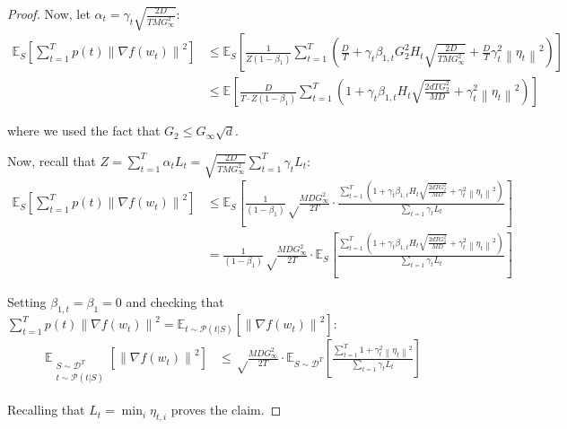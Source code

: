 \documentclass{article}
\newcommand{\norm}[1]{\left\lVert{#1}\right\rVert}
\newcommand{\currw}{w_t}
\newcommand{\curre}{\eta_t}
\newcommand{\currei}{\eta_{t,i}}
\newcommand{\curra}{\alpha_t}
\newcommand{\normed}[1]{\left\lVert {#1} \right\rVert}
\newcommand{\bone}{\beta_1}
\newcommand{\bonet}{\beta_{1,t}}
\newcommand{\fdist}{D}
\newcommand{\smooth}{M}
\newcommand{\lowinft}{L_{t}}
\newcommand{\highinft}{H_{t}}
\newcommand{\gradb}{G_\infty}
\newcommand{\gradbtwo}{G_2}
\newcommand{\expec}[2]{\mathbb E_{#1} \left[ {#2} \right]}
\newcommand{\algrand}{\substack{S \sim \dist^T \\ t \sim \mathcal P(t|S)}}
\newcommand{\dist}{\mathcal D}
\begin{document}
\begin{proof}
Now, let $\curra = \gamma_t \sqrt{\frac{2 \fdist}{T \smooth \gradb^2}}$:
\begin{equation}
\begin{split}
   \expec{S}{\sum_{t=1}^T p(t) \normed{\nabla f(\currw)}^2} &\leq \expec{S}{\frac1{Z (1-\bone)} \sum_{t=1}^T \left(\frac{D}{T} + \gamma_t \bonet \gradbtwo^2 \highinft \sqrt{\frac{2 D}{T \smooth \gradb^2}}  + \frac{D}{T} \gamma_t^2 \norm{\curre}^2 \right)} \\
   &\leq \expec{}{\frac{D}{T \cdot Z (1-\bone)} \sum_{t=1}^T \left(1 + \gamma_t \bonet \highinft \sqrt{\frac{2 d T \gradbtwo^2}{ \smooth D}} + \gamma_t^2 \norm{\curre}^2 \right)}
\end{split}
\end{equation}

where we used the fact that $\gradbtwo \leq \gradb \sqrt d$.

Now, recall that $Z = \sum_{t=1}^T \curra \lowinft = \sqrt{\frac{2 \fdist}{T \smooth \gradb^2}} \sum_{t=1}^T \gamma_t \lowinft$:
\begin{equation}
\begin{split}
   \expec{S}{\sum_{t=1}^T p(t) \normed{\nabla f(\currw)}^2} &\leq \expec{S}{\frac{1}{(1-\bone)} \sqrt\frac{\smooth \fdist \gradb^2}{2T} \cdot \frac{\sum_{t=1}^T \left(1 + \gamma_t \bonet \highinft \sqrt{\frac{2 d T \gradbtwo^2}{ \smooth D}} + \gamma_t^2 \norm{\curre}^2 \right)}{\sum_{t=1} \gamma_t \lowinft}} \\
   &= \frac{1}{(1-\bone)} \sqrt\frac{\smooth \fdist \gradb^2}{2T} \cdot \expec{S}{\frac{\sum_{t=1}^T \left(1 + \gamma_t \bonet \highinft \sqrt{\frac{2 d T \gradbtwo^2}{ \smooth D}} + \gamma_t^2 \norm{\curre}^2 \right)}{\sum_{t=1} \gamma_t \lowinft}}
\end{split}
\label{eq-proof2inter1}
\end{equation}

Setting $\bonet = \bone = 0$ and checking that $\sum_{t=1}^T p(t) \normed{\nabla f(\currw)}^2 = \expec{t \sim \mathcal P (t|S)}{\normed{\nabla f(\currw)}^2}$:
\begin{equation}
\begin{split}
     \expec{\algrand}{\normed{\nabla f(\currw)}^2} & \leq \sqrt\frac{\smooth \fdist \gradb^2}{2T} \cdot \expec{S \sim \dist^T}{\frac{\sum_{t=1}^T 1 + \gamma_t^2 \norm{\curre}^2 }{\sum_{t=1} \gamma_t \lowinft}}
\end{split}
\label{eq-proof2final}
\end{equation}

Recalling that $\lowinft = \min_i \currei$ proves the claim.

\end{proof}
\end{document}
